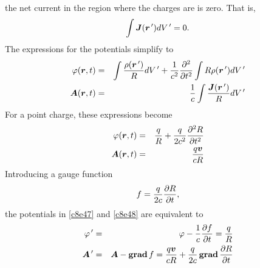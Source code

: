 \begin{enumerate}
the net current in the region where the charges are is zero. That is,
\[
\int\bm{J}(\bm{r}^{\,\prime})dV^{\,\prime} = 0.
\]
The expressions for the potentials simplify to
\begin{eqnarray}
\varphi(\bm{r}, t) &=& \int\frac{\rho(\bm{r}^{\,\prime})}{R}dV^{\,\prime} + \frac{1}{c^2}
\frac{\partial^2}{\partial t^2}\int R\rho(\bm{r}^{\,\prime})dV^{\,\prime} \label{c8e45} \\
\bm{A}(\bm{r}, t) &=& \frac{1}{c}\int\frac{\bm{J}(\bm{r}^{\,\prime})}{R}dV^{\,\prime}
\label{c8e46}
\end{eqnarray}
For a point charge, these expressions become
\begin{eqnarray}
\varphi(\bm{r}, t) &=& \frac{q}{R} + \frac{q}{2c^2}\frac{\partial^2{R}}{\partial{t}^2} \label{c8e47}\\
\bm{A}(\bm{r}, t) &=& \frac{q\bm{v}}{cR} \label{c8e48}
\end{eqnarray}
Introducing a gauge function
\begin{equation}\label{c8e49}
f = \frac{q}{2c}\frac{\partial{R}}{\partial{t}},
\end{equation}
the potentials in \eqref{c8e47} and \eqref{c8e48} are equivalent to
\begin{eqnarray}
\varphi^{\,\prime} &=& \varphi - \frac{1}{c}\frac{\partial{f}}{\partial{t}} = \frac{q}{R} \label{c8e50} \\
\bm{A}^{\,\prime} &=& \bm{A} - \operatorname{\textbf{grad}}{f} = \frac{q\bm{v}}{cR} + \frac{q}{2c}\operatorname{\textbf{grad}}
\frac{\partial{R}}{\partial{t}} \label{c8e51}
\end{eqnarray}

\end{enumerate}
